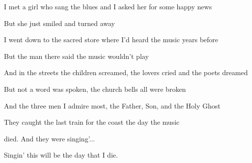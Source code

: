 \begin{song}
\bigskip

\Chorus \par

\bigskip

I met a girl who sang the blues and I asked her for some happy news \par
But she just smiled and turned away \par
I went down to the sacred store where I'd heard the music years before \par
But the man there said the music wouldn't play \par

\bigskip

And in the streets the children screamed, the lovers cried and the poets dreamed \par
But not a word was spoken, the church bells all were broken \par
And the three men I admire most, the Father, Son, and the Holy Ghost \par
They caught the last train for the coast the day the music \par
{}died. And they were singing'... \par

\bigskip

\Chorus \par
{} \par
Singin' this will be the day that I die. \par

\end{song}